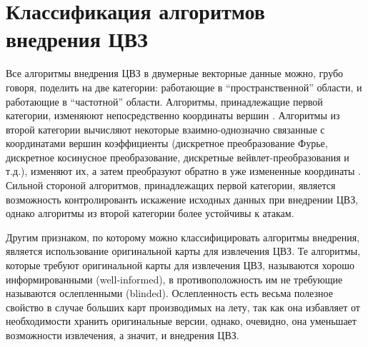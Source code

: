 \section{Классификация алгоритмов внедрения ЦВЗ}
\label{sec:classification}
Все алгоритмы внедрения ЦВЗ в двумерные векторные данные можно, грубо говоря, поделить на две категории: 
работающие в ``пространственной'' области, и работающие в ``частотной'' области. 
Алгоритмы, принадлежащие первой категории, изменяюют непосредственно 
координаты вершин \cite{Voight, Kim, Chang, Bazin}. Алгоритмы из второй категории вычисляют некоторые 
взаимно-однозначно связанные с координатами вершин коэффициенты (дискретное преобразование Фурье, 
дискретное косинусное преобразование, дискретные вейвлет-преобразования и т.д.), изменяют их, а затем 
преобразуют обратно в уже измененные координаты \cite{Ohbuchi, Ohbuchi3D, Praun}.  
Сильной стороной алгоритмов, принадлежащих первой категории, является возможность контролированть искажение
исходных данных при внедрении ЦВЗ, однако алгоритмы из второй категории более устойчивы к атакам.

Другим признаком, по которому можно классифицировать алгоритмы внедрения, является использование 
оригинальной карты для извлечения ЦВЗ. Те алгоритмы, которые требуют оригинальной карты для извлечения ЦВЗ,
называются хорошо информированными (well-informed), в противоположность им не требующие называются ослепленными
(blinded). Ослепленность есть весьма полезное свойство в случае больших карт производимых на лету, 
так как она избавляет от необходимости хранить оригинальные версии, однако, очевидно, она уменьшает возможности
извлечения, а значит, и внедрения ЦВЗ.

